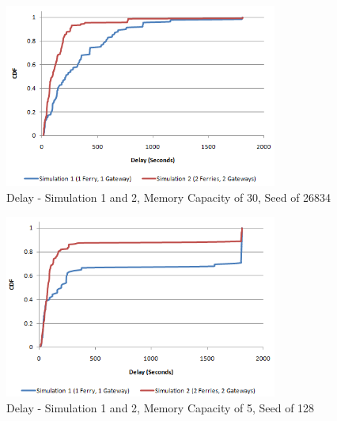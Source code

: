 \begin{figure}[htbp]
    \centering
    \includegraphics[width=0.8\textwidth]{images/result_delay_both_128_mc30.png}
    \caption{Delay - Simulation 1 and 2, Memory Capacity of 30, Seed of 26834}
    \label{fig:result_delay_both_128_mc30}
\end{figure}


\begin{figure}[htbp]
    \centering
    \includegraphics[width=0.8\textwidth]{images/result_delay_both_128_mc5.png}
    \caption{Delay - Simulation 1 and 2, Memory Capacity of 5, Seed of 128}
    \label{fig:result_delay_both_128_mc5}
\end{figure}
